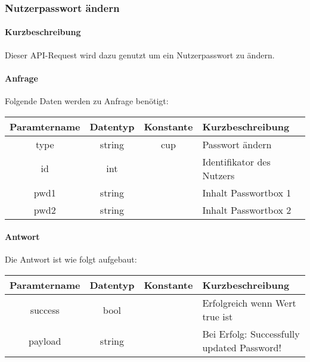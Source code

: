 \subsubsection{Nutzerpasswort ändern}
\paragraph{Kurzbeschreibung}Dieser API-Request wird dazu genutzt um ein Nutzerpasswort zu ändern.
\paragraph{Anfrage}Folgende Daten werden zu Anfrage benötigt:
\begin{table}[H]
	\begin{tabular}{|c|c|c|p{6.5cm}|}
		\hline
		\textbf{Paramtername} & \textbf{Datentyp} & \textbf{Konstante} & \textbf{Kurzbeschreibung}                                                                                               \\ \hline
		type                & string            & cup                & Passwort ändern \\ \hline
		id                  & int               &                    & Identifikator des Nutzers \\ \hline
		pwd1                & string            &                    & Inhalt Passwortbox 1 \\ \hline
		pwd2                & string            &                    & Inhalt Passwortbox 2 \\ \hline
	\end{tabular}
\end{table}
\paragraph{Antwort}Die Antwort ist wie folgt aufgebaut:
\begin{table}[H]
	\begin{tabular}{|c|c|c|p{6.5cm}|}
		\hline
		\textbf{Paramtername} & \textbf{Datentyp} & \textbf{Konstante} & \textbf{Kurzbeschreibung}            \\ \hline                
		success             & bool             &                 & Erfolgreich wenn Wert {\glqq true\grqq} ist \\ \hline
		payload             & string           &                 & Bei Erfolg: {\glqq Successfully updated Password!\grqq} \\ \hline
	\end{tabular}
\end{table}
